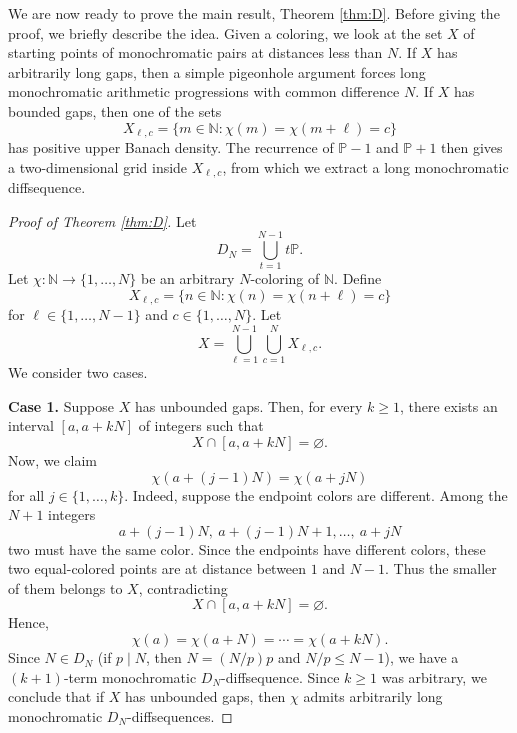 \documentclass{amsart}
\theoremstyle{definition}
\begin{document}
We are now ready to prove the main result, Theorem \ref{thm:D}. Before giving the proof, we briefly describe the idea. Given a coloring, we look at the set $X$ of starting points of monochromatic pairs at distances less than $N$. If $X$ has arbitrarily long gaps, then a simple pigeonhole argument forces long monochromatic arithmetic progressions with common difference $N$. If $X$ has bounded gaps, then one of the sets $$X_{\ell,c}=\{m \in \mathbb{N} : \chi(m)=\chi(m+\ell)=c\}$$ has positive upper Banach density. The recurrence of $\mathbb{P}-1$ and $\mathbb{P}+1$ then gives a two-dimensional grid inside $X_{\ell,c}$, from which we extract a long monochromatic diffsequence.

\begin{proof}[Proof of Theorem \ref{thm:D}]

Let $$D_N=\bigcup_{t=1}^{N-1}t\mathbb{P}.$$ Let $\chi : \mathbb{N} \to \{1,\dots,N\}$ be an arbitrary $N$-coloring of $\mathbb{N}$. Define $$X_{\ell,c}=\{n \in \mathbb{N} : \chi(n)=\chi(n+\ell)=c\}$$ for $\ell \in \{1,\dots,N-1\}$ and $c \in \{1,\dots,N\}$. Let $$X=\bigcup_{\ell=1}^{N-1}\bigcup_{c=1}^{N}X_{\ell,c}.$$ We consider two cases.

\medskip 
\noindent \textbf{Case 1.} Suppose $X$ has unbounded gaps. Then, for every $k \geq 1$, there exists an interval $[a,a+kN]$ of integers such that $$X \cap [a,a+kN]=\varnothing.$$ Now, we claim $$\chi(a+(j-1)N)=\chi(a+jN)$$ for all $j \in \{1,\dots,k\}$. Indeed, suppose the endpoint colors are different. Among the $N+1$ integers $$a+(j-1)N,\ a+(j-1)N+1,\dots,\ a+jN$$ two must have the same color. Since the endpoints have different colors, these two equal-colored points are at distance between $1$ and $N-1$. Thus the smaller of them belongs to $X$, contradicting $$X\cap [a,a+kN]=\varnothing.$$ Hence, $$\chi(a)=\chi(a+N)=\cdots=\chi(a+kN).$$ Since $N \in D_N$ (if $p \mid N$, then $N=(N/p)p$ and $N/p\leq N-1$), we have a $(k+1)$-term monochromatic $D_N$-diffsequence. Since $k \geq 1$ was arbitrary, we conclude that if $X$ has unbounded gaps, then $\chi$ admits arbitrarily long monochromatic $D_{N}$-diffsequences.


\end{proof}
\end{document}
